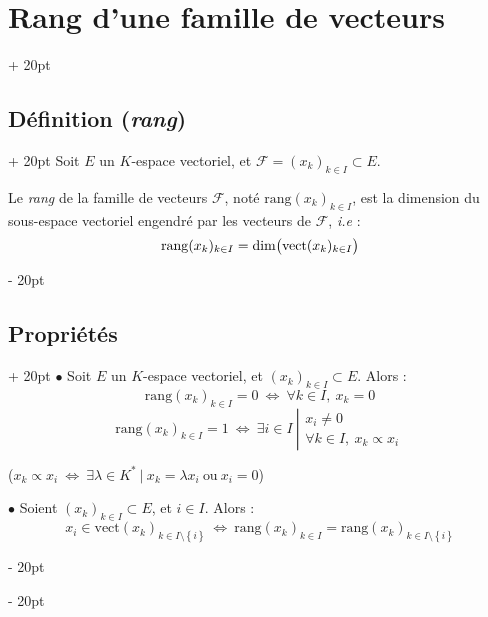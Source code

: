 \documentclass[a4paper, 12pt, twoside]{article}
\newcommand{\lr}[1]{\left( #1 \right)}
\newcommand{\set}[1]{\left\{ #1 \right\}}
\newcommand{\ssi}{\ \Leftrightarrow \ }
\newcommand{\ind}[1][20pt]{\advance\leftskip + #1}
\newcommand{\deind}[1][20pt]{\advance\leftskip - #1}
\newenvironment{indt}[2][20pt]{#2 \par \ind[#1]}{\par \deind} %
\begin{document}
    \begin{indt}{\section{Rang d'une famille de vecteurs}}
        
        \begin{indt}{\subsection{Définition (\textit{rang})}}
            Soit $E$ un $K$-espace vectoriel, et $\mathcal F = (x_k)_{k \in I} \subset E$.
            
            Le \textit{rang} de la famille de vecteurs $\mathcal F$, noté $\mathrm{rang}(x_k)_{k \in I}$, est la dimension du sous-espace vectoriel engendré par les vecteurs de $\mathcal F$, \textit{i.e} :
                \[ \mathrm{rang}(x_k)_{k \in I} = \dim\!\lr{\mathrm{vect}(x_k)_{k \in I} \vphantom{\tfrac a a}} \]
        \end{indt}
        
        \vspace{12pt}
        
        \begin{indt}{\subsection{Propriétés}}
            $\bullet$ Soit $E$ un $K$-espace vectoriel, et $(x_k)_{k \in I} \subset E$. Alors :
                \[ \mathrm{rang}(x_k)_{k \in I} = 0 \ssi \forall k \in I,\ x_k = 0 \]
                \[
                    \mathrm{rang}(x_k)_{k \in I} = 1
                    \ssi
                    \exists i \in I\
                    \left|
                    \begin{array}{l}
                        x_i \neq 0
                        \\
                        \forall k \in I,\ x_k \propto x_i
                    \end{array}
                    \right.
                \]
            
            ($x_k \propto x_i \ssi \exists \lambda \in K^*\ |\ x_k = \lambda x_i\ \text{ou}\ x_i = 0$)
            
            \vspace{18pt}
            
            $\bullet$ Soient $(x_k)_{k \in I} \subset E$, et $i \in I$. Alors :
                \[ x_i \in \mathrm{vect}(x_k)_{k \in I \setminus \set i} \ssi \mathrm{rang}(x_k)_{k \in I} = \mathrm{rang}(x_k)_{k \in I \setminus \set i} \]
            

\end{indt}
\end{indt}
\end{document}
